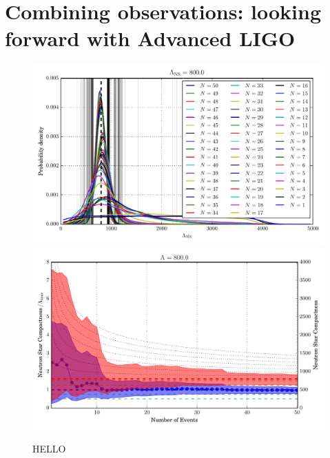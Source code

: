 \documentclass[aps,prd,amsmath,floats,floatfix, twocolumn,
superscriptaddress,nofootinbib,showpacs]{revtex4-1}
\begin{document}
\section{Combining observations: looking forward with Advanced LIGO}\label{s1:multiple_observations}
% 
% 
\begin{figure}
\centering    
\includegraphics[width=1.\columnwidth]{plots/pdfLambda_vs_N_L800.pdf}
\includegraphics[width=1.\columnwidth]{plots/FillBetweenNormErrorBarsLambda_vs_N_L800.pdf}
\caption{HELLO
}
\label{fig:TT_Lambda_vs_N_L800_CI90_0}
\end{figure}
%
% 
\end{document}
